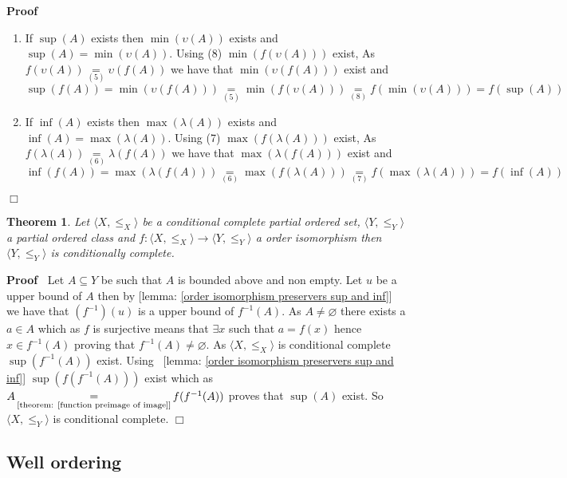\documentclass{book}
\newcommand{\equallim}{\mathop{=}\limits}
\newenvironment{proof}{\noindent\textbf{Proof\ }}{\hspace*{\fill}$\Box$\medskip}
\newtheorem{theorem}{Theorem}
\begin{document}
\begin{proof}
\begin{enumerate}
    \item If $\sup (A)$ exists then $\min (\upsilon (A))$ exists and $\sup (A)
    = \min (\upsilon (A))$. Using (8) $\min (f (\upsilon (A)))$ exist, As $f
    (\upsilon (A)) \equallim_{(5)} \upsilon (f (A))$ we have that $\min
    (\upsilon (f (A)))$ exist and
    \[ \sup (f (A)) = \min (\upsilon (f (A))) \equallim_{(5)} \min (f
       (\upsilon (A))) \equallim_{(8)} f (\min (\upsilon (A))) = f (\sup (A))
    \]
    \item If $\inf (A)$ exists then $\max (\lambda (A))$ exists and $\inf (A)
    = \max (\lambda (A))$. Using (7) $\max (f (\lambda (A)))$ exist, As $f
    (\lambda (A)) \equallim_{(6)} \lambda (f (A))$ we have that $\max (\lambda
    (f (A)))$ exist and
    \[ \inf (f (A)) = \max (\lambda (f (A))) \equallim_{(6)} \max (f (\lambda
       (A))) \equallim_{(7)} f (\max (\lambda (A))) = f (\inf (A)) \]
  \end{enumerate}
\end{proof}

\begin{theorem}
  \label{order isomorphism and conditional complete}Let $\langle X,
  \leqslant_X \rangle$ be a conditional complete partial ordered set, $\langle
  Y, \leqslant_Y \rangle$ a partial ordered class and $f : \langle X,
  \leqslant_X \rangle \rightarrow \langle Y, \leqslant_Y \rangle$ a order
  isomorphism then $\langle Y, \leqslant_Y \rangle$ is conditionally complete.
\end{theorem}

\begin{proof}
  Let $A \subseteq Y$ be such that $A$ is bounded above and non empty. Let $u$
  be a upper bound of $A$ then by [lemma: \ref{order isomorphism preservers
  sup and inf}] we have that $(f^{- 1}) (u)$ is a upper bound of $f^{- 1}
  (A)$. As $A \neq \varnothing$ there exists a $a \in A$ which as $f$ is
  surjective means that $\exists x$ such that $a = f (x)$ hence $x \in f^{- 1}
  (A)$ proving that $f^{- 1} (A) \neq \varnothing$. As $\langle X, \leqslant_X
  \rangle$ is conditional complete $\sup (f^{- 1} (A))$ exist. Using \ [lemma:
  \ref{order isomorphism preservers sup and inf}] $\sup (f (f^{- 1} (A)))$
  exist which as $A \equallim_{\text{[theorem: \ref{function preimage of
  image}]}} f (f^{- 1} (A)) $ proves that $\sup (A)$ exist. So $\langle X,
  \leqslant_Y \rangle$ is conditional complete.
\end{proof}

\subsection{Well ordering}
\end{document}
